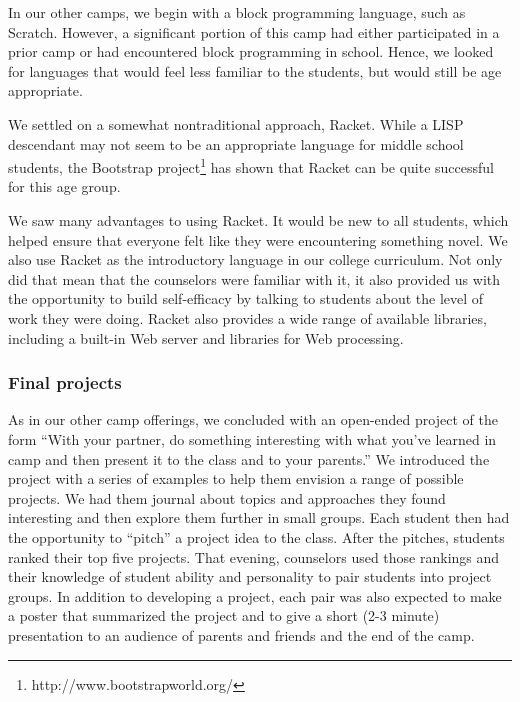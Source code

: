 In our other camps, we begin with a block programming language,
such as Scratch.  However, a significant portion of this camp had
either participated in a prior camp or had encountered block
programming in school.  Hence, we looked for languages that would
feel less familiar to the students, but would still be age appropriate.

We settled on a somewhat nontraditional approach, Racket.  While a
LISP descendant may not seem to be an appropriate language for
middle school students, the Bootstrap
project\footnote{http://www.bootstrapworld.org/} \cite{Bootstrap-McClanahan,Bootstrap-SPLASH2013,Bootstrap-SIGCSE2018} has shown that
Racket can be quite successful for this age group.

We saw many advantages to using Racket.  It would be new to
all students, which helped ensure that everyone felt like they
were encountering something novel.  We also use Racket as the
introductory language in our college curriculum.  Not only did that
mean that the counselors were familiar with it, it also provided
us with the opportunity to build self-efficacy by talking to students
about the level of work they were doing.  Racket also provides a
wide range of available libraries, including a built-in Web server
and libraries for Web processing.  

\subsubsection{Final projects}

As in our other camp offerings, we concluded with an open-ended
project of the form ``With your partner, do something interesting
with what you've learned in camp and then present it to the class
and to your parents.'' We introduced the project with a series of
examples to help them envision a range of possible projects.  We
had them journal about topics and approaches they found interesting
and then explore them further in small groups.  Each student then
had the opportunity to ``pitch'' a project idea to the class.  After
the pitches, students ranked their top five projects.  That evening,
counselors used those rankings and their knowledge of student ability
and personality to pair students into project groups.
In addition to developing a project, each pair was also expected to make
a poster that summarized the project and to give a short (2-3 minute)
presentation to an audience of parents and friends and the end of the
camp.

